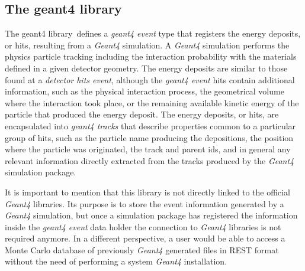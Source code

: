 \subsection{The geant4 library}\label{sc:geant4lib}

The geant4 library\,\cite{REST_Geant4_Git} defines a \emph{geant4 event} type that registers the energy deposits, or hits, resulting from a \emph{Geant4} simulation. A \emph{Geant4} simulation performs the physics particle tracking including the interaction probability with the materials defined in a given detector geometry. The energy deposits are similar to those found at a \emph{detector hits event}, although the \emph{geant4 event} hits contain additional information, such as the physical interaction process, the geometrical volume where the interaction took place, or the remaining available kinetic energy of the particle that produced the energy deposit. The energy deposits, or hits, are encapsulated into \emph{geant4 tracks} that describe properties common to a particular group of hits, such as the particle name producing the depositions, the position where the particle was originated, the track and parent ids, and in general any relevant information directly extracted from the tracks produced by the \emph{Geant4} simulation package.

It is important to mention that this library is not directly linked to the official \emph{Geant4} libraries. Its purpose is to store the event information generated by a \emph{Geant4} simulation, but once a simulation package has registered the information inside the \emph{geant4 event} data holder the connection to \emph{Geant4} libraries is not required anymore. In a different perspective, a user would be able to access a Monte Carlo database of previously \emph{Geant4} generated files in REST format without the need of performing a system \emph{Geant4} installation.

